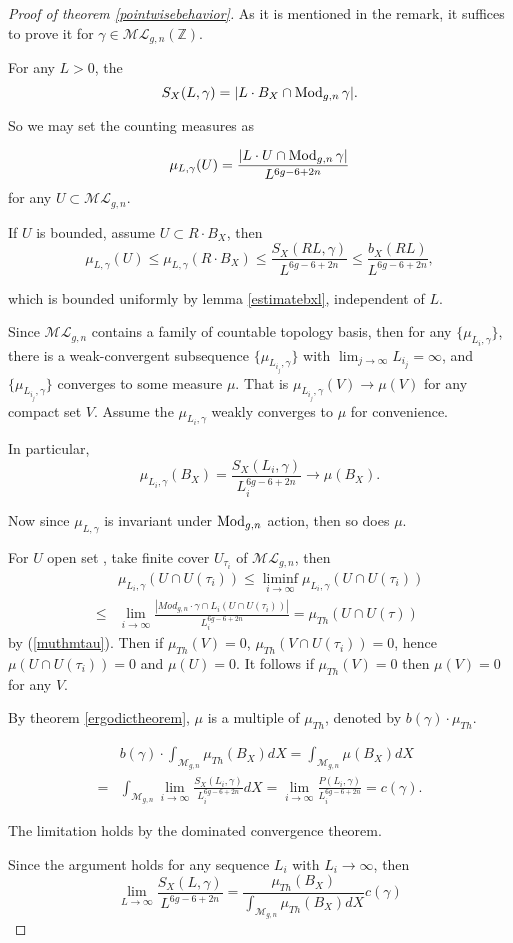 \begin{proof}[Proof of theorem \ref{pointwisebehavior}]
As it is  mentioned in the remark, it suffices to prove it for $\gamma\in \mathscr{ML}_{g,n}(\mathbb{Z})$. 

For any $L>0$, the $$
S_X(L,\gamma)=|L\cdot B_X\cap \operatorname{Mod}_{g,n}\gamma|.$$

So we may set the counting measures as 

$$\mu_{L,\gamma}(U)=\frac{|L\cdot U\cap \operatorname{Mod}_{g,n}\gamma|}{L^{6g-6+2n}}$$ for any $U\subset \mathscr{ML}_{g,n}.$

If $U$ is bounded, assume $U\subset R\cdot B_X$, then $$\mu_{L,\gamma}(U)\leq \mu_{L,\gamma}(R\cdot B_X)\leq \frac{S_X(RL,\gamma)}{L^{6g-6+2n}}\leq \frac{b_X(RL)}{L^{6g-6+2n}},$$

which is bounded uniformly by lemma \ref{estimatebxl}, independent of $L$. 

Since $\mathscr{ML}_{g,n}$ contains a family of countable topology basis, then  for any $\{\mu_{L_i,\gamma}\}$,  there is a weak-convergent subsequence $\{\mu_{L_{i_j},\gamma}\}$ with $\lim_{j\to \infty}L_{i_j}=\infty$, and $\{\mu_{L_{i_j},\gamma}\}$ converges to some measure  $\mu$. That is $\mu_{L_{i_j},\gamma}(V)\to \mu(V)$ for any compact set $V$. Assume the $\mu_{L_i,\gamma}$ weakly converges to $\mu$ for convenience.


In particular, $$\mu_{L_i,\gamma}(B_X)=\frac{S_X(L_i,\gamma)}{L_i^{6g-6+2n}}\to \mu(B_X).$$ 

Now since $\mu_{L,\gamma}$ is invariant under $\operatorname{Mod}_{g,n}$ action, then so does $\mu$.   

For $U$ open set , take finite cover $U_{\tau_i}$ of  $\mathscr{ML}_{g,n}$, then 
 $$
 \begin{aligned}
 &\mu_{L_i,\gamma}(U\cap U(\tau_i))\leq \liminf_{i\to \infty}\mu_{L_i,\gamma}(U\cap U(\tau_i))\\
 \leq &\lim_{i\to \infty}\frac{|Mod_{g,n}\cdot\gamma\cap L_i(U\cap U(\tau_i))|}{L_i^{6g-6+2n}}=\mu_{Th}(U\cap U(\tau))
 \end{aligned}
 $$
 by (\ref{muthmtau}). Then if $\mu_{Th}(V)=0$,  $\mu_{Th}(V\cap U(\tau_i))=0$, hence $\mu(U\cap U(\tau_i))=0$ and $\mu(U)=0$. 
  It follows if $\mu_{Th}(V)=0$ then $\mu(V)=0$ for any $V$.
  
  By theorem \ref{ergodictheorem}, $\mu$ is a multiple of $\mu_{Th}$, denoted by $b(\gamma)\cdot \mu_{Th}$. 
  
  $$
  \begin{aligned}
  &b(\gamma)\cdot \int_{\mathscr{M}_{g,n}}\mu_{Th}(B_X)dX=\int_{\mathscr{M}_{g,n}}\mu(B_X)dX\\
  =&\int_{\mathscr{M}_{g,n}}\lim_{i\to \infty}\frac{S_X(L_i,\gamma)}{L_i^{6g-6+2n}}dX=
  \lim_{i\to \infty}\frac{P(L_i,\gamma)}{L_i^{6g-6+2n}}=c(\gamma).
  \end{aligned}
  $$
  
  The limitation holds by the dominated convergence theorem.
  
  Since the argument holds for any sequence $L_i$ with $L_i\to \infty$, then $$
  \lim_{L\to \infty}\frac{S_X(L,\gamma)}{L^{6g-6+2n}}=\frac{\mu_{Th}(B_X)}{\int_{\mathscr{M}_{g,n}}\mu_{Th}(B_X)dX}c(\gamma)
  $$
\end{proof}

